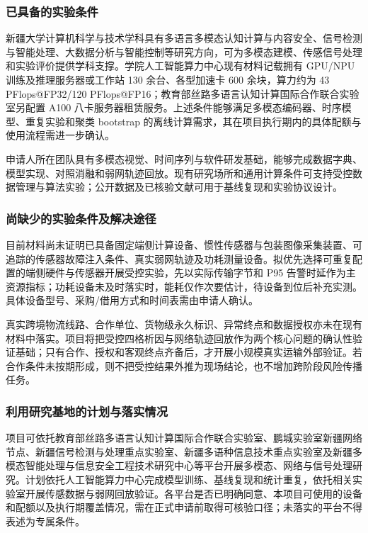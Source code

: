 \justifying
\NSFCBodyText

\subsubsection{已具备的实验条件}

新疆大学计算机科学与技术学科具有多语言多模态认知计算与内容安全、信号检测与智能处理、大数据分析与智能控制等研究方向，可为多模态建模、传感信号处理和实验评价提供学科支撑。学院人工智能算力中心现有材料记载拥有 GPU/NPU 训练及推理服务器或工作站 130 余台、各型加速卡 600 余块，算力约为 43 PFlops@FP32/120 PFlops@FP16；教育部丝路多语言认知计算国际合作联合实验室另配置 A100 八卡服务器租赁服务。上述条件能够满足多模态编码器、时序模型、重复实验和聚类 bootstrap 的离线计算需求，其在项目执行期内的具体配额与使用流程需进一步确认。

申请人所在团队具有多模态视觉、时间序列与软件研发基础，能够完成数据字典、模型实现、对照消融和弱网轨迹回放。现有研究场所和通用计算条件可支持受控数据管理与算法实验；公开数据及已核验文献可用于基线复现和实验协议设计。

\subsubsection{尚缺少的实验条件及解决途径}

目前材料尚未证明已具备固定端侧计算设备、惯性传感器与包装图像采集装置、可追踪的传感器故障注入条件、真实弱网轨迹及功耗测量设备。拟优先选择可重复配置的端侧硬件与传感器开展受控实验，先以实际传输字节和 P95 告警时延作为主资源指标；功耗设备未及时落实时，能耗仅作次要估计，待设备到位后补充实测。具体设备型号、采购/借用方式和时间表需由申请人确认。

真实跨境物流线路、合作单位、货物级永久标识、异常终点和数据授权亦未在现有材料中落实。项目将把受控四格析因与网络轨迹回放作为两个核心问题的确认性验证基础；只有合作、授权和客观终点齐备后，才开展小规模真实运输外部验证。若合作条件未按期形成，则不把受控结果外推为现场结论，也不增加跨阶段风险传播任务。

\subsubsection{利用研究基地的计划与落实情况}

项目可依托教育部丝路多语言认知计算国际合作联合实验室、鹏城实验室新疆网络节点、新疆信号检测与处理重点实验室、新疆多语种信息技术重点实验室及新疆多模态智能处理与信息安全工程技术研究中心等平台开展多模态、网络与信号处理研究。计划依托人工智能算力中心完成模型训练、基线复现和统计重复，依托相关实验室开展传感数据与弱网回放验证。各平台是否已明确同意、本项目可使用的设备和配额以及执行期覆盖情况，需在正式申请前取得可核验口径；未落实的平台不得表述为专属条件。
